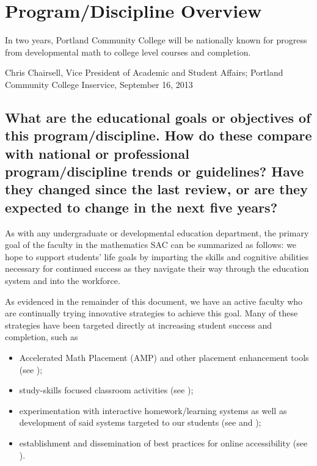 \chapter{Program/Discipline Overview}

\epigraph{In two years, Portland Community College will be nationally known for
progress from developmental math to college level courses and completion.}
{Chris Chairsell, Vice President of Academic and Student Affairs; Portland
Community College Inservice, September 16, 2013}

\section[Educational objectives]{What are the educational goals or objectives of this
 program/discipline.   How do these compare with national or professional
 program/discipline trends or guidelines?   Have they changed since the last
review, or are they expected to change in the next five years? }

As with any undergraduate or developmental education department, the primary
goal of the faculty in the mathematics SAC can be summarized as follows: we hope
to support students' life goals by imparting the skills and cognitive
abilities necessary for continued success as they navigate their way through the
education system and into the workforce.

As evidenced in the remainder of this document, we have an active faculty who
are continually trying innovative strategies to achieve this goal.  Many of
these strategies have been targeted directly at increasing student success and
completion, such as
\begin{itemize}
	\item Accelerated Math Placement (AMP) and other placement enhancement tools
	(see );
	\item study-skills focused classroom activities (see );
	\item experimentation with interactive homework/learning systems as well as
	development of said systems targeted to our students (see
	 and );
	\item establishment and dissemination of best practices for
	online accessibility (see ).
\end{itemize}

